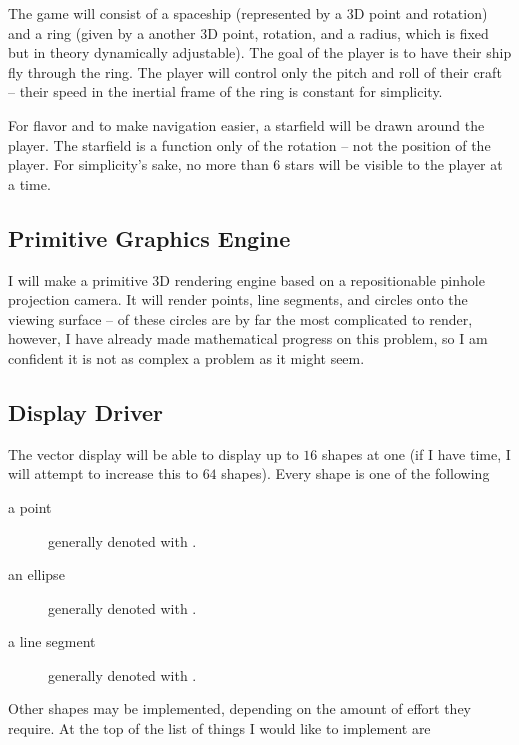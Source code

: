 The game will consist of a spaceship (represented by a 3D point and rotation) and a ring (given by a another 3D point, rotation, and a radius, which is fixed but in theory dynamically adjustable). The goal of the player is to have their ship fly through the ring. The player will control only the pitch and roll of their craft -- their speed in the inertial frame of the ring is constant for simplicity.

For flavor and to make navigation easier, a starfield will be drawn around the player. The starfield is a function only of the rotation -- not the position of the player. For simplicity's sake, no more than 6 stars will be visible to the player at a time.

\subsection{Primitive Graphics Engine}

I will make a primitive 3D rendering engine based on a repositionable pinhole projection camera. It will render points, line segments, and circles onto the viewing surface -- of these circles are by far the most complicated to render, however, I have already made mathematical progress on this problem, so I am confident it is not as complex a problem as it might seem.

\subsection{Display Driver}

The vector display will be able to display up to $16$ shapes at one (if I have time, I will attempt to increase this to $64$ shapes). Every shape is one of the following

\begin{description}

\item[a point] generally denoted with .

\item[an ellipse] generally denoted with .

\item[a line segment] generally denoted with .

\end{description}

Other shapes may be implemented, depending on the amount of effort they require. At the top of the list of things I would like to implement are


